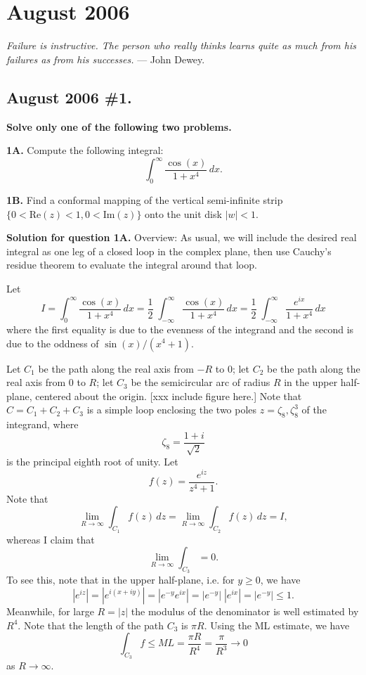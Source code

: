 \documentclass[10pt]{article}
\numberwithin{equation}{subsection}
\begin{document}
\newpage
\section{August 2006}

\begin{center}
\emph{
Failure is instructive. The person who really thinks learns quite as much from
his failures as from his successes.
}
--- John Dewey.
\end{center}

\subsection{August 2006 \#1.}
\textbf{Solve only one of the following two problems.}

\textbf{1A.}  Compute the following integral:
$$
	\int_0^\infty \frac{\cos(x)}{1+x^4}\,dx.
$$

\textbf{1B.}  Find a conformal mapping of the vertical semi-infinite strip
$\{0 < \mathrm{Re}(z) < 1, 0 < \mathrm{Im}(z)\}$ onto the unit disk
$|w| < 1$.

\textbf{Solution for question 1A.}  Overview:  As usual, we will include the
desired real integral as one leg of a closed loop in the complex plane, then
use Cauchy's residue theorem to evaluate the integral around that loop.

Let
$$
	I = \int_0^\infty \frac{\cos(x)}{1+x^4}\,dx
	= \frac{1}{2}\;\int_{-\infty}^\infty \frac{\cos(x)}{1+x^4}\,dx
	= \frac{1}{2}\;\int_{-\infty}^\infty \frac{e^{ix}}{1+x^4}\,dx
$$
where the first equality is due to the evenness of the integrand and the second
is due to the oddness of $\sin(x)/(x^4+1)$.

Let $C_1$ be the path along the real axis from $-R$ to $0$;
let $C_2$ be the path along the real axis from $0$ to $R$;
let $C_3$ be the semicircular arc of radius $R$ in the upper half-plane,
centered about the origin.  [xxx include figure here.]
Note that $C=C_1+C_2+C_3$ is a simple loop enclosing the two poles $z=\zeta_8,
\zeta_8^3$ of the integrand, where
$$
	\zeta_8 = \frac{1+i}{\sqrt{2}}
$$
is the principal eighth root of unity.
Let
$$
	f(z) = \frac{e^{iz}}{z^4+1}.
$$
Note that
$$
	\lim_{R \to \infty}\int_{C_1} f(z) \,dz =
	\lim_{R \to \infty}\int_{C_2} f(z) \,dz =
	I,
$$
whereas I claim that
$$
	\lim_{R \to \infty}\int_{C_3} = 0.
$$
To see this, note that in the upper half-plane, i.e. for $y\ge 0$, we have
$$
	|e^{iz}| =
	|e^{i(x+iy)}| =
	|e^{-y}e^{ix}| =
	|e^{-y}|\;|e^{ix}| =
	|e^{-y}| \le 1.
$$
Meanwhile, for large $R=|z|$ the modulus of the denominator is well estimated
by $R^4$.  Note that the length of the path $C_3$ is $\pi R$.
Using the ML estimate, we have
$$
	\int_{C_3} f \le ML = \frac{\pi R}{R^4} = \frac{\pi }{R^3} \to 0
$$
as $R \to \infty$.
\end{document}
